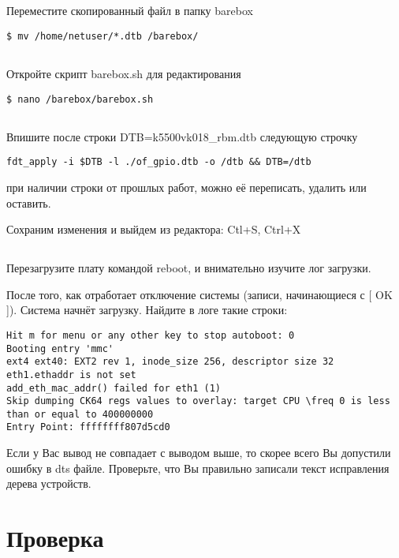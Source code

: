 \subsection{}Переместите скопированный файл в папку barebox
\begin{lstlisting}[style=bash]
$ mv /home/netuser/*.dtb /barebox/
\end{lstlisting}

\subsection{}Откройте скрипт barebox.sh для редактирования
\begin{lstlisting}[style=bash]
$ nano /barebox/barebox.sh
\end{lstlisting}

\subsection{}Впишите после строки DTB=k5500vk018\_rbm.dtb следующую строчку 
\begin{lstlisting}[style=stdout]
fdt_apply -i $DTB -l ./of_gpio.dtb -o /dtb && DTB=/dtb
\end{lstlisting}
при наличии строки от прошлых работ, можно её переписать, удалить или оставить.

Сохраним изменения и выйдем из редактора: Ctl+S,  Ctrl+X

\subsection{}Перезагрузите плату командой reboot, и внимательно изучите лог загрузки.

После того, как отработает отключение системы (записи, начинающиеся с [ OK ]). Система начнёт загрузку. Найдите в логе такие строки:
\begin{lstlisting}[style=stdout] 
Hit m for menu or any other key to stop autoboot: 0
Booting entry 'mmc'
ext4 ext40: EXT2 rev 1, inode_size 256, descriptor size 32
eth1.ethaddr is not set
add_eth_mac_addr() failed for eth1 (1)
Skip dumping CK64 regs values to overlay: target CPU \freq 0 is less than or equal to 400000000
Entry Point: ffffffff807d5cd0
\end{lstlisting}
Если у Вас вывод не совпадает с выводом выше, то скорее всего Вы допустили ошибку в dts файле. Проверьте, что Вы правильно записали текст исправления дерева устройств.

\section{Проверка}

